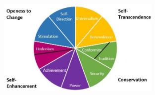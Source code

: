 \begin{figure}[!ht]
	\centering
	\includegraphics[width=0.7\textwidth]{figures/basicHumanValues}
\end{figure}
\vspace{1cm}
{
\small
\begin{tabular}{ccc}


\end{tabular}}
